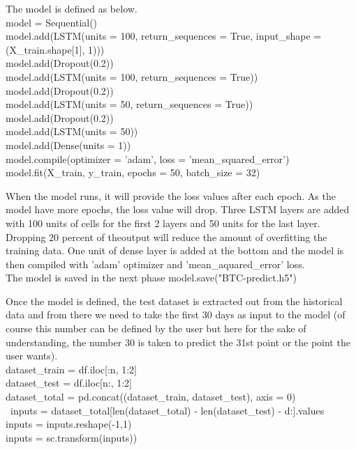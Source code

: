 \documentclass[11pt]{diazessay} %
\begin{document}
The model is defined as below.\\

{\selectfont
\noindent model = Sequential()\\
model.add(LSTM(units = 100, return\_sequences = True, input\_shape = (X\_train.shape[1], 1)))\\
model.add(Dropout(0.2))\\
model.add(LSTM(units = 100, return\_sequences = True))\\
model.add(Dropout(0.2))\\
model.add(LSTM(units = 50, return\_sequences = True))\\
model.add(Dropout(0.2))\\
model.add(LSTM(units = 50))\\
model.add(Dense(units = 1))\\
model.compile(optimizer = 'adam', loss = 'mean\_squared\_error')\\
model.fit(X\_train, y\_train, epochs = 50, batch\_size = 32)\\
}

When the model runs, it will provide the loss values after each epoch. As the model have more epochs, the loss value will drop. Three LSTM layers are added with 100 units of cells for the first 2 layers and 50 units for the last layer. Dropping 20 percent of theoutput will reduce the amount of overfitting the training data. One unit of dense layer is added at the bottom and the model is then compiled with 'adam' optimizer and 'mean\_aquared\_error' loss. \\

The model  is saved in the next phase
{\selectfont
\noindent model.save("BTC-predict.h5")
}

Once the model is defined, the test dataset is extracted out from the historical data and from there we need to take the first 30 days as input to the model (of course this number can be defined by the user but here for the sake of understanding, the number 30 is taken to predict the 31st point or the point the user wants). \\

{\selectfont
\noindent dataset\_train = df.iloc[:n, 1:2]\\
dataset\_test = df.iloc[n:, 1:2]\\
dataset\_total = pd.concat((dataset\_train, dataset\_test), axis = 0)\\\
inputs = dataset\_total[len(dataset\_total) - len(dataset\_test) - d:].values\\
inputs = inputs.reshape(-1,1)\\
inputs = sc.transform(inputs))\\
}
\end{document}

